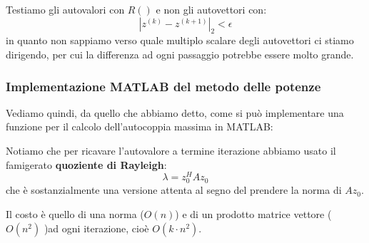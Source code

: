 \documentclass[a4paper,11pt]{article}
\begin{document}
Testiamo gli autovalori con $R()$ e non gli autovettori con:
$$
|z^{(k)} - z^{(k + 1)}|_2 < \epsilon
$$
in quanto non sappiamo verso quale multiplo scalare degli autovettori ci stiamo dirigendo, per cui la differenza ad ogni passaggio potrebbe essere molto grande.

\subsubsection{Implementazione MATLAB del metodo delle potenze}
Vediamo quindi, da quello che abbiamo detto, come si può implementare una funzione per il calcolo dell'autocoppia massima in MATLAB:
\lstset{style=codestyle, language=MATLAB}


Notiamo che per ricavare l'autovalore a termine iterazione abbiamo usato il famigerato \textbf{quoziente di Rayleigh}:
$$
\lambda = z_0^H A z_0
$$
che è sostanzialmente una versione attenta al segno del prendere la norma di $A z_0$.

Il costo è quello di una norma ($O(n)$) e di un prodotto matrice vettore ($O(n^2)$ )ad ogni iterazione, cioè $O(k \cdot n^2)$.
\end{document}
